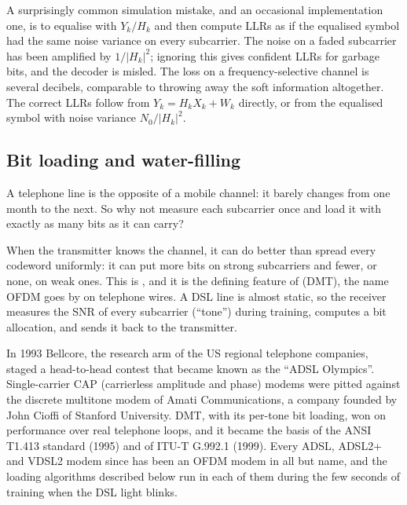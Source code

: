 \begin{pitfall}
A surprisingly common simulation mistake, and an occasional implementation one, is to equalise with
$Y_k/H_k$ and then compute LLRs as if the equalised symbol had the same noise variance on every subcarrier. The
noise on a faded subcarrier has been amplified by $1/|H_k|^2$; ignoring this gives confident LLRs for
garbage bits, and the decoder is misled. The loss on a frequency-selective channel is several decibels,
comparable to throwing away the soft information altogether. The correct LLRs follow from $Y_k=H_kX_k+W_k$
directly, or from the equalised symbol with noise variance $N_0/|H_k|^2$.
\end{pitfall}

\subsection{Bit loading and water-filling}

A telephone line is the opposite of a mobile channel: it barely changes from one month to the next.
So why not measure each subcarrier once and load it with exactly as many bits as it can carry?

When the transmitter knows the channel, it can do better than spread every codeword uniformly: it can put more
bits on strong subcarriers and fewer, or none, on weak ones. This is , and it is
the defining feature of  (DMT), the name OFDM goes by on telephone wires. A DSL
line is almost static, so the receiver measures the SNR of every subcarrier (``tone'') during training,
computes a bit allocation, and sends it back to the transmitter.


\begin{history}
In 1993 Bellcore, the research arm of the US regional telephone companies, staged a head-to-head
contest that became known as the ``ADSL Olympics''. Single-carrier CAP (carrierless amplitude and phase)
modems were pitted against the discrete multitone modem of Amati Communications, a company founded by
John Cioffi of Stanford University. DMT, with its per-tone bit loading, won on performance over real
telephone loops, and it became the basis of the ANSI T1.413 standard (1995) and of ITU-T G.992.1 (1999).
Every ADSL, ADSL2+ and VDSL2 modem since has been an OFDM modem in all but name, and the loading
algorithms described below run in each of them during the few seconds of training when the DSL light
blinks.
\end{history}

